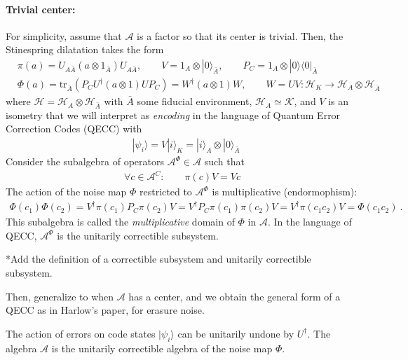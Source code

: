 \documentclass[11pt]{article}
\newcommand{\mH}{\mathcal{H}}
\newcommand{\mA}{\mathcal{A}}
\newcommand{\mK}{\mathcal{K}}
\newcommand{\ket}[1]{|#1\rangle}
\newcommand{\bra}[1]{\langle #1|}
\newcommand{\nn}{\nonumber}
\begin{document}
\paragraph{Trivial center:} For simplicity, assume that $\mA$ is a factor so that its center is trivial. Then, the Stinespring dilatation takes the form
\begin{align}
 &\pi(a)=U_{A\bar{A}}(a\otimes 1_{\bar{A}}) U_{A\bar{A}},\qquad V=1_A\otimes \ket{0}_{\bar{A}}, \qquad P_C=1_A\otimes \ket{0}\bra{0}_{\bar{A}}\nn\\
 &\Phi(a)=\text{tr}_{\bar{A}}(P_C U^\dagger (a\otimes 1) U P_C)=W^\dagger(a\otimes 1) W, \qquad W=U V:\mH_K\to \mH_A\otimes \mH_{\bar{A}}
\end{align}
where $\mH=\mH_A\otimes \mH_{\bar{A}}$ with $\bar{A}$ some fiducial environment, $\mH_A\simeq \mK$, and $V$ is an isometry that we will interpret as {\it encoding} in the language of Quantum Error Correction Codes (QECC) with 
\begin{align}
    &\ket{\psi_i}=V\ket{i}_K=\ket{i}_A\otimes \ket{0}_{\bar{A}}
\end{align}
Consider the subalgebra of operators $\mA^\Phi\in \mA$ such that
\begin{align}
    \forall c\in \mA^C: \qquad \pi(c)V=V c
\end{align}
The action of the noise map $\Phi$ restricted to $\mA^\Phi$ is multiplicative (endormophism):
\begin{align}
    \Phi(c_1)\Phi(c_2)=V^\dagger \pi(c_1) P_C \pi(c_2) V=V^\dagger P_C \pi(c_1)\pi(c_2)V=V^\dagger \pi(c_1c_2)V=\Phi(c_1c_2)\ .
\end{align}
This subalgebra is called the {\it multiplicative} domain of $\Phi$ in $\mA$. In the language of QECC, $\mA^\Phi$ is the unitarily correctible subsystem. 

*Add the definition of a correctible subsystem and unitarily correctible subsystem.

Then, generalize to when $\mA$ has a center, and we obtain the general form of a QECC as in Harlow's paper, for erasure noise.

The action of errors on code states $\ket{\psi_i}$ can be unitarily undone by $U^\dagger$. The algebra $\mA$ is the unitarily correctible algebra of the noise map $\Phi$. 
\end{document}
